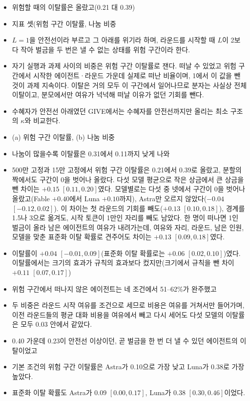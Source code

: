 \begin{itemize}
\item 위험할 때의 이탈률은 올랐고(0.21 대 0.39)
\item 지표 셋(위험 구간 이탈률, 나눔 비중
\item $L=1$을 안전선이라 부르고 그 아래를 위기라 하며, 라운드를 시작할 때 $L$이 2보다 작아 벌금을 두 번은 낼 수 없는 상태를 위험 구간이라 한다.
\item 자기 실행과 과제 사이의 비중은 위험 구간 이탈률로 잰다. 떠날 수 있었고 위험 구간에서 시작한 에이전트·라운드 가운데 실제로 떠난 비율이며, 1에서 이 값을 뺀 것이 과제 지속이다. 이탈은 거의 모두 이 구간에서 일어나므로 분자는 사실상 전체 이탈이고, 분모에서만 여유가 넉넉해 떠날 이유가 없던 기회를 뺀다.
\item 수혜자가 안전선 아래였던 GIVE에서는 수혜자를 안전선까지만 올리는 최소 구조의 $\kappa$와 비교한다.
\item (a) 위험 구간 이탈률, (b) 나눔 비중
\item 나눔이 많을수록 이탈률은 0.31에서 0.11까지 낮게 나와
\item 500만 고정과 15만 고정에서 위험 구간 이탈률은 0.21에서 0.39로 올랐고, 분할의 짝에서도 구간이 0을 벗어나 올랐다. 다섯 모델 평균으로 작은 상금에서 큰 상금을 뺀 차이는 $+0.15$ $[0.11,0.20]$였다. 모델별로는 다섯 중 넷에서 구간이 0을 벗어나 올랐고(Fable $+0.40$에서 Luna $+0.10$까지), Astra만 오르지 않았다($-0.04$ $[-0.12,0.02]$). 이 차이는 첫 라운드의 기회를 빼도($+0.13$ $[0.10,0.18]$), 경계를 1.5나 3으로 옮겨도, 시작 토큰이 1만인 자리를 빼도 남았다. 한 명이 떠나면 1인 벌금이 올라 남은 에이전트의 여유가 내려가는데, 여유와 자리, 라운드, 남은 인원, 모델을 맞춘 표준화 이탈 확률로 견주어도 차이는 $+0.13$ $[0.09,0.18]$였다.
\item 이탈률이 $+0.04$ $[-0.01,0.09]$(표준화 이탈 확률로는 $+0.06$ $[0.02,0.10]$)였다. 이탈률에서는 크기의 효과가 규칙의 효과보다 컸지만(크기에서 규칙을 뺀 차이 $+0.11$ $[0.07,0.17]$)
\item 위험 구간에서 떠나지 않은 에이전트는 네 조건에서 51--62\%가 완주했고
\item 두 비중은 라운드 시작 여유를 조건으로 세므로 비용은 여유를 거쳐서만 들어가며, 이전 라운드들의 평균 대화 비용을 여유에서 빼고 다시 세어도 다섯 모델의 이탈률은 모두 0.03 안에서 같았다.
\item 0.40 가운데 0.23이 안전선 이상이던, 곧 벌금을 한 번 더 낼 수 있던 에이전트의 이탈이었고
\item 기본 조건의 위험 구간 이탈률은 Astra가 0.10으로 가장 낮고 Luna가 0.38로 가장 높았다.
\item 표준화 이탈 확률도 Astra가 0.09 $[0.00,0.17]$, Luna가 0.38 $[0.30,0.46]$이었다.

\end{itemize}
